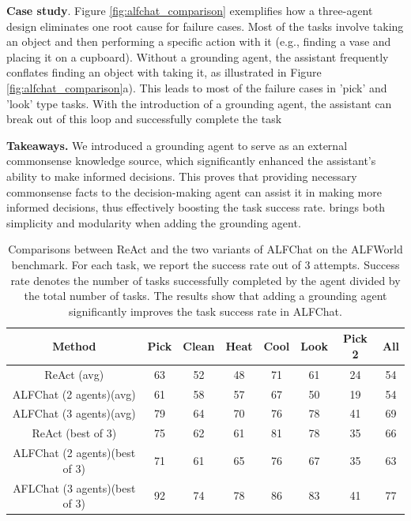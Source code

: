\textbf{Case study}. Figure \ref{fig:alfchat_comparison} exemplifies how a three-agent design eliminates one root cause for failure cases. Most of the tasks involve taking an object and then performing a specific action with it (e.g., finding a vase and placing it on a cupboard). Without a grounding agent, the assistant frequently conflates finding an object with taking it, as illustrated in Figure \ref{fig:alfchat_comparison}a). This leads to most of the failure cases in 'pick' and 'look' type tasks. With the introduction of a grounding agent, the assistant can break out of this loop and successfully complete the task


\textbf{Takeaways.} We introduced a grounding agent to serve as an external commonsense knowledge source, which significantly enhanced the assistant's ability to make informed decisions. This proves that providing necessary commonsense facts to the decision-making agent can assist it in making more informed decisions, thus effectively boosting the task success rate. \libName brings both simplicity and modularity when adding the grounding agent. 



\begin{table}[]
\centering
\begin{tabular}{c|cccccc|c}
\hline
Method                      & Pick & Clean & Heat & Cool & Look & Pick 2 & All \\ \hline
ReAct (avg)                  & 63   & 52    & 48   & 71   & 61   & 24     & 54  \\ 
ALFChat (2 agents)(avg)       & 61   & 58    & 57   & 67   & 50   & 19     & 54  \\
ALFChat (3 agents)(avg) & 79   & 64    & 70   & 76   & 78  & 41     & 69  \\ \hline
ReAct (best of 3)            & 75   & 62    & 61   & 81   & 78   & 35     & 66  \\ 
ALFChat (2 agents)(best of 3) & 71   & 61    & 65   & 76   & 67   & 35     & 63  \\ 
AFLChat (3 agents)(best of 3) & 92   & 74    & 78   & 86   & 83  & 41     & 77  \\ \hline
\end{tabular}
\caption{Comparisons between ReAct and the two variants of ALFChat on the ALFWorld benchmark. For each task, we report the success rate out of 3 attempts. Success rate denotes the number of tasks successfully completed by the agent divided by the total number of tasks. The results show that adding a grounding agent significantly improves the task success rate in ALFChat.}
\label{tab:alfworld}
\end{table}